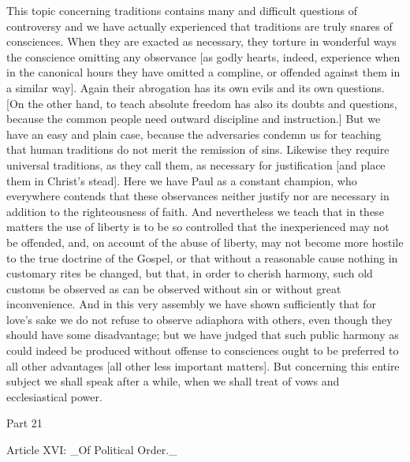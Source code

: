 This topic concerning traditions contains many and difficult
questions of controversy and we have actually experienced that
traditions are truly snares of consciences.  When they are exacted as
necessary, they torture in wonderful ways the conscience omitting any
observance [as godly hearts, indeed, experience when in the canonical
hours they have omitted a compline, or offended against them in a
similar way].  Again their abrogation has its own evils and its own
questions.  [On the other hand, to teach absolute freedom has also
its doubts and questions, because the common people need outward
discipline and instruction.] But we have an easy and plain case,
because the adversaries condemn us for teaching that human traditions
do not merit the remission of sins.  Likewise they require universal
traditions, as they call them, as necessary for justification [and
place them in Christ's stead].  Here we have Paul as a constant
champion, who everywhere contends that these observances neither
justify nor are necessary in addition to the righteousness of faith.
And nevertheless we teach that in these matters the use of liberty is
to be so controlled that the inexperienced may not be offended, and,
on account of the abuse of liberty, may not become more hostile to
the true doctrine of the Gospel, or that without a reasonable cause
nothing in customary rites be changed, but that, in order to cherish
harmony, such old customs be observed as can be observed without sin
or without great inconvenience.  And in this very assembly we have
shown sufficiently that for love's sake we do not refuse to observe
adiaphora with others, even though they should have some disadvantage;
but we have judged that such public harmony as could indeed be
produced without offense to consciences ought to be preferred to all
other advantages [all other less important matters].  But concerning
this entire subject we shall speak after a while, when we shall treat
of vows and ecclesiastical power.




Part 21


Article XVI: _Of Political Order._

